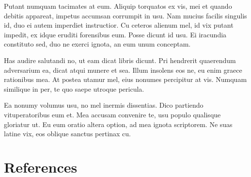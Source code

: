 \documentclass[]{article}
\begin{document}
Putant numquam tacimates at eum. Aliquip torquatos ex vis, mei et quando
debitis appareat, impetus accumsan corrumpit in usu. Nam mucius facilis
singulis id, duo ei autem imperdiet instructior. Cu ceteros alienum mel,
id vix putant impedit, ex idque eruditi forensibus eum. Posse dicunt id
usu. Ei iracundia constituto sed, duo ne exerci ignota, an eum unum
conceptam.

Has audire salutandi no, ut eam dicat libris dicunt. Pri hendrerit
quaerendum adversarium ea, dicat atqui munere et sea. Illum insolens eos
ne, eu enim graece rationibus mea. At postea utamur mel, eius nonumes
percipitur at vis. Numquam similique in per, te quo saepe utroque
pericula.

Ea nonumy volumus usu, no mel inermis dissentias. Dico partiendo
vituperatoribus eum et. Mea accusam convenire te, usu populo qualisque
gloriatur ut. Eu eum oratio altera option, ad mea ignota scriptorem. Ne
suas latine vix, eos oblique sanctus pertinax cu.

\section{References}\label{references}
\end{document}

